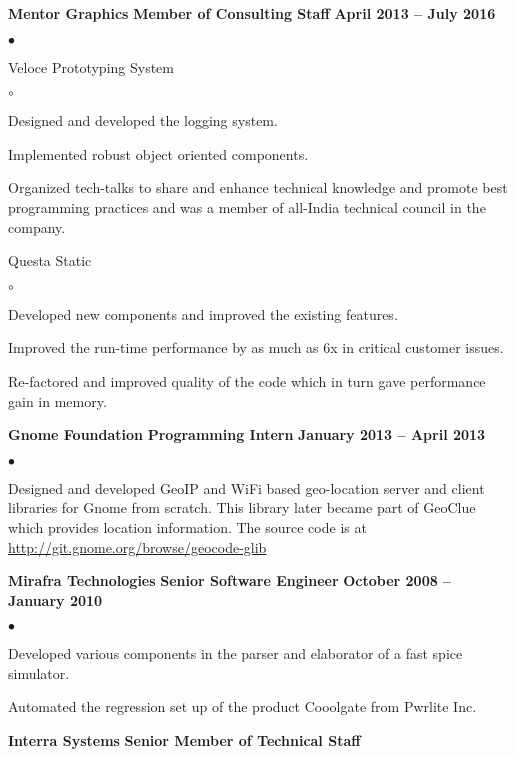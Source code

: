 \documentclass[margin,line]{res}
\newenvironment{list1}{
  \begin{list}{$\bullet$}{%
      \setlength{\itemsep}{0in}
      \setlength{\parsep}{0in} \setlength{\parskip}{0in}
      \setlength{\topsep}{0in} \setlength{\partopsep}{0in}
      \setlength{\leftmargin}{0.17in}}}{\end{list}}
\newenvironment{list2}{
  \begin{list}{$\circ$}{%
      \setlength{\itemsep}{0in}
      \setlength{\parsep}{0in} \setlength{\parskip}{0in}
      \setlength{\topsep}{0in} \setlength{\partopsep}{0in}
      \setlength{\leftmargin}{0.2in}}}{\end{list}}
\begin{document}
\begin{resume}
{\bf   Mentor Graphics}
\hfill {\bf Member of Consulting Staff}
\hfill{\bf April 2013 -- July 2016}
\vspace{.05in}
\begin{list1} %
	\item Veloce Prototyping System
	\begin{list2}
		\item Designed and developed the logging system.
		\item Implemented robust object oriented components.
		\item Organized tech-talks to share and enhance technical knowledge and promote best programming practices and was a member of all-India technical council in the company.
	\end{list2}
	\item Questa Static
	\begin{list2}
		\item Developed new components and improved the existing features.
		\item Improved the run-time performance by as much as 6x in critical customer issues.
		\item Re-factored and improved quality of the code which in turn gave performance gain in memory.
	\end{list2}
\end{list1}
{\bf   Gnome Foundation}
\hfill {\bf Programming Intern}
\hfill{\bf January 2013 -- April 2013}
\vspace{.05in}
\begin{list1} %
\item Designed and developed GeoIP and WiFi based geo-location server and client libraries for Gnome from scratch. This library later became part of GeoClue which provides location information. The source code is at \url {http://git.gnome.org/browse/geocode-glib}
\end{list1}
{\bf   Mirafra Technologies}
\hfill {\bf Senior Software Engineer}
\hfill{\bf October 2008 -- January 2010}
\vspace{.05in}
\begin{list1} %
\item Developed various components in the parser and elaborator of a fast spice simulator.
\item Automated the regression set up of the product Cooolgate from Pwrlite Inc.
\end{list1}
{\bf   Interra Systems}
\hfill {\bf Senior Member of Technical Staff}

\end{resume}
\end{document}
